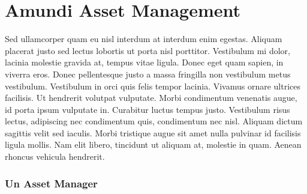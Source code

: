 \chapter{Amundi Asset Management}

Sed ullamcorper quam eu nisl interdum at interdum enim egestas. Aliquam placerat justo sed lectus lobortis ut porta nisl porttitor. Vestibulum mi dolor, lacinia molestie gravida at, tempus vitae ligula. Donec eget quam sapien, in viverra eros. Donec pellentesque justo a massa fringilla non vestibulum metus vestibulum. Vestibulum in orci quis felis tempor lacinia. Vivamus ornare ultrices facilisis. Ut hendrerit volutpat vulputate. Morbi condimentum venenatis augue, id porta ipsum vulputate in. Curabitur luctus tempus justo. Vestibulum risus lectus, adipiscing nec condimentum quis, condimentum nec nisl. Aliquam dictum sagittis velit sed iaculis. Morbi tristique augue sit amet nulla pulvinar id facilisis ligula mollis. Nam elit libero, tincidunt ut aliquam at, molestie in quam. Aenean rhoncus vehicula hendrerit.
\subsection{Un Asset Manager}

